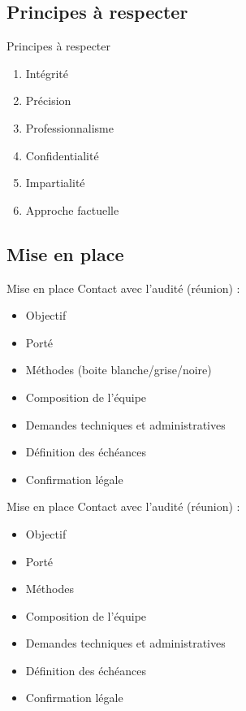 \documentclass{beamer}
\newcommand{\colorized}[1]{{\color{red}{#1}}}
\begin{document}
		\subsection{Principes à respecter}
		\begin{frame}{Principes à respecter}
			\begin{enumerate}
				\item Intégrité
				\item Précision
				\item Professionnalisme
				\item Confidentialité
				\item Impartialité
				\item Approche factuelle
			\end{enumerate}
		
		\end{frame}
	
	
		\subsection{Mise en place}
		\begin{frame}{Mise en place}
		     Contact avec l'audité (réunion) : 
			\begin{itemize}
				\item Objectif
				\item Porté
				\item Méthodes (boite blanche/grise/noire)
				\item Composition de l'équipe
				\item Demandes techniques et administratives
				\item Définition des échéances
				\item Confirmation légale
			\end{itemize}		
		\end{frame}
	
		\begin{frame}{Mise en place}
			Contact avec l'audité (réunion) : 
			\begin{itemize}
				\item Objectif \colorized{Garantir une application sans failles de l'OWASP Top 10}
				\item Porté \colorized{Application web}
				\item Méthodes \colorized{Boite blanche}
				\item Composition de l'équipe
				\item Demandes techniques et administratives \colorized{code source}
				\item Définition des échéances \colorized{\today}
				\item Confirmation légale
			\end{itemize}		
		\end{frame}
	
\end{document}
